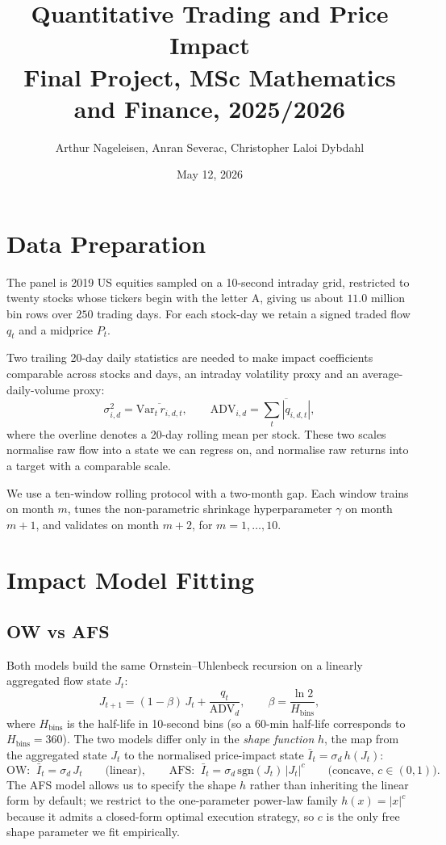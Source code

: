 \documentclass[11pt,a4paper]{article}
\title{Quantitative Trading and Price Impact\\
       \large Final Project, MSc Mathematics and Finance, 2025/2026}
\author{Arthur Nageleisen, Anran Severac, Christopher Laloi Dybdahl }
\date{May 12, 2026}
\begin{document}
\maketitle


\section{Data Preparation}\label{sec:data}

The panel is 2019 US equities sampled on a 10-second intraday grid,
restricted to twenty stocks whose tickers begin with the letter A,
giving us about $11.0$ million bin rows over $250$ trading days.
For each stock-day we retain a signed traded flow $q_t$ and a midprice
$P_t$.

Two trailing 20-day daily statistics are needed to make impact
coefficients comparable across stocks and days, an intraday volatility
proxy and an average-daily-volume proxy:
\[
  \sigma_{i,d}^2 = \overline{\mathrm{Var}_t\,r_{i,d,t}},
  \qquad
  \mathrm{ADV}_{i,d} = \overline{\textstyle\sum_t |q_{i,d,t}|},
\]
where the overline denotes a 20-day rolling mean per stock.  These two
scales normalise raw flow into a state we can regress on, and
normalise raw returns into a target with a comparable scale.

We use a ten-window rolling protocol with a two-month gap.  Each
window trains on month $m$, tunes the non-parametric shrinkage
hyperparameter $\gamma$ on month $m+1$, and validates on month $m+2$,
for $m = 1, \dots, 10$.
\section{Impact Model Fitting}\label{sec:fit}

\subsection{OW vs AFS}\label{sec:recursion}

Both models build the same Ornstein--Uhlenbeck recursion on a
linearly aggregated flow state $J_t$:
\[
  J_{t+1} = (1-\beta)\,J_t + \frac{q_t}{\mathrm{ADV}_d},
  \qquad
  \beta = \frac{\ln 2}{H_{\text{bins}}},
\]
where $H_{\text{bins}}$ is the half-life in 10-second bins (so a 60-min
half-life corresponds to $H_{\text{bins}} = 360$).  The two models
differ only in the \emph{shape function} $h$, the map from the
aggregated state $J_t$ to the normalised price-impact state
$\bar I_t = \sigma_d\,h(J_t)$:
\[
  \text{OW:}\;\;\bar I_t = \sigma_d\,J_t
  \qquad\text{(linear)},
  \qquad
  \text{AFS:}\;\;\bar I_t = \sigma_d\,\mathrm{sgn}(J_t)\,|J_t|^{c}
  \qquad\text{(concave, } c \in (0,1)\text{)}.
\]
The AFS model allows us to specify the shape $h$ rather than inheriting the linear
form by default; we restrict to the one-parameter power-law family
$h(x) = |x|^{c}$ because it admits a closed-form optimal execution
strategy, so $c$ is the only free shape parameter we fit empirically.
\end{document}
